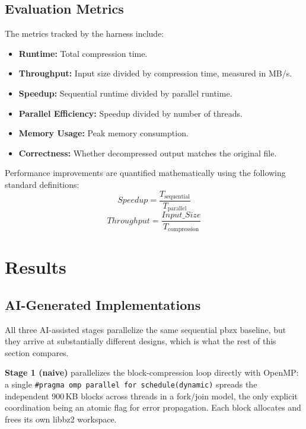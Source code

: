 \documentclass[conference]{IEEEtran}
\begin{document}
\subsection{Evaluation Metrics}
The metrics tracked by the harness include:
\begin{itemize}
  \item \textbf{Runtime:} Total compression time.
  \item \textbf{Throughput:} Input size divided by compression time, measured in MB/s.
  \item \textbf{Speedup:} Sequential runtime divided by parallel runtime.
  \item \textbf{Parallel Efficiency:} Speedup divided by number of threads.
  \item \textbf{Memory Usage:} Peak memory consumption.
  \item \textbf{Correctness:} Whether decompressed output matches the original file.
\end{itemize}

Performance improvements are quantified mathematically using the following standard definitions:
\begin{equation}
\mathit{Speedup} = \frac{T_{\text{sequential}}}{T_{\text{parallel}}}
\end{equation}
\begin{equation}
\mathit{Throughput} = \frac{\mathit{Input\_Size}}{T_{\text{compression}}}
\end{equation}
\section{Results}

\subsection{AI-Generated Implementations}
All three AI-assisted stages parallelize the same sequential pbzx baseline, but they arrive at substantially different designs, which is what the rest of this section compares.

\textbf{Stage 1 (naive)} parallelizes the block-compression loop directly with OpenMP: a single \texttt{\#pragma omp parallel for schedule(dynamic)} spreads the independent 900\,KB blocks across threads in a fork/join model, the only explicit coordination being an atomic flag for error propagation. Each block allocates and frees its own libbz2 workspace.
\end{document}
